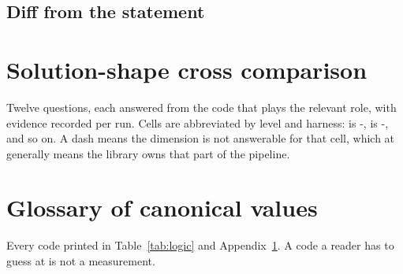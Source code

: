 \subsection{Diff from the \Ltwo{} statement}


\section{Solution-shape cross comparison}
\label{app:shape}

Twelve questions, each answered from the code that plays the relevant role, with
 evidence recorded per run. Cells are abbreviated by level and
harness:  is \Ltwo{}-,  is \Lthree{}-, and
so on. A dash means the dimension is not answerable for that cell, which at
\Ltwo{} generally means the library owns that part of the pipeline.

\begin{center}
\scriptsize

\end{center}

\section{Glossary of canonical values}
\label{app:glossary}

Every code printed in Table~\ref{tab:logic} and Appendix~\ref{app:shape}. A code
a reader has to guess at is not a measurement.


